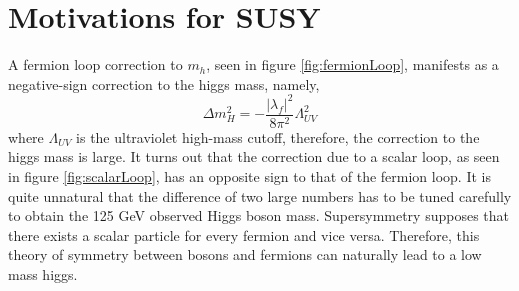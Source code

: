 \section{Motivations for SUSY}
A fermion loop correction to $m_{h}$, seen in figure \ref{fig:fermionLoop}, 
manifests as a negative-sign correction to the higgs mass, namely,
\begin{equation}
\Delta m_{H}^{2}=-\frac{|\lambda_{f}|^{2}}{8\pi^{2}}\Lambda_{UV}^{2}
\label{eq:SUS1}
\end{equation}
where $\Lambda_{UV}$ is the ultraviolet high-mass cutoff, %
therefore, the correction to the higgs mass is large. 
It turns out that the correction due to a scalar loop,
as seen in figure \ref{fig:scalarLoop}, has an opposite sign to that of the fermion loop.
It is quite unnatural that the difference of two large numbers has to be tuned
carefully to obtain the 125 GeV observed Higgs boson mass. 
Supersymmetry supposes that there exists a scalar particle
for every fermion and vice versa. 
Therefore, this theory of symmetry between bosons
and fermions can naturally lead to a low mass higgs. 




